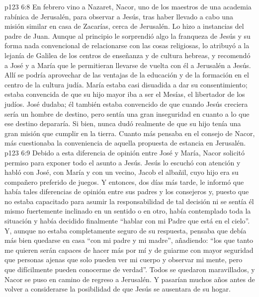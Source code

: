 \vs p123 6:8 \pc En febrero vino a Nazaret, Nacor, uno de los maestros de una academia rabínica de Jerusalén, para observar a Jesús, tras haber llevado a cabo una misión similar en casa de Zacarías, cerca de Jerusalén. Lo hizo a instancias del padre de Juan. Aunque al principio le sorprendió algo la franqueza de Jesús y su forma nada convencional de relacionarse con las cosas religiosas, lo atribuyó a la lejanía de Galilea de los centros de enseñanza y de cultura hebreas, y recomendó a José y a María que le permitieran llevarse de vuelta con él a Jerusalén a Jesús. Allí se podría aprovechar de las ventajas de la educación y de la formación en el centro de la cultura judía. María estaba casi disuadida a dar su consentimiento; estaba convencida de que su hijo mayor iba a ser el Mesías, el libertador de los judíos. José dudaba; él también estaba convencido de que cuando Jesús creciera sería un hombre de destino, pero sentía una gran inseguridad en cuanto a lo que ese destino depararía. Si bien, nunca dudó realmente de que su hijo tenía una gran misión que cumplir en la tierra. Cuanto más pensaba en el consejo de Nacor, más cuestionaba la conveniencia de aquella propuesta de estancia en Jerusalén.
\vs p123 6:9 Debido a esta diferencia de opinión entre José y María, Nacor solicitó permiso para exponer todo el asunto a Jesús. Jesús lo escuchó con atención y habló con José, con María y con un vecino, Jacob el albañil, cuyo hijo era su compañero preferido de juegos. Y entonces, dos días más tarde, le informó que había tales diferencias de opinión entre sus padres y los consejeros y, puesto que no estaba capacitado para asumir la responsabilidad de tal decisión ni se sentía él mismo fuertemente inclinado en un sentido o en otro, había contemplado toda la situación y había decidido finalmente “hablar con mi Padre que está en el cielo”. Y, aunque no estaba completamente seguro de su respuesta, pensaba que debía más bien quedarse en casa “con mi padre y mi madre”, añadiendo: “los que tanto me quieren serán capaces de hacer más por mí y de guiarme con mayor seguridad que personas ajenas que solo pueden ver mi cuerpo y observar mi mente, pero que difícilmente pueden conocerme de verdad”. Todos se quedaron maravillados, y Nacor se puso en camino de regreso a Jerusalén. Y pasarían muchos años antes de volver a considerarse la posibilidad de que Jesús se ausentara de su hogar.
